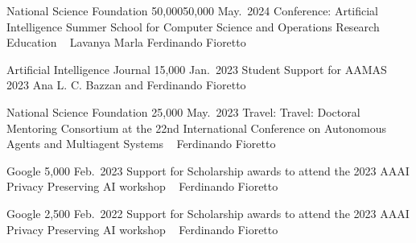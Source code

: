 \vspace{-16pt}

\begin{projects}
	\grantentrycoPI
	{National Science Foundation}
	{50,000}{50,000}
	{May.~2024}{}
	{Conference: Artificial Intelligence Summer School for Computer Science and Operations Research Education}
	{~}
	{Lavanya Marla}
	{Ferdinando Fioretto}

	\grantentrySinglePI
	{Artificial Intelligence Journal}
	{15,000}
	{Jan.~2023}{}
	{Student Support for AAMAS 2023}
	{}
	{Ana L. C. Bazzan and Ferdinando Fioretto}

	\grantentrySinglePI
	{National Science Foundation}
	{25,000}
	{May.~2023}{}
	{Travel: Travel: Doctoral Mentoring Consortium at the 22nd International Conference on Autonomous Agents and Multiagent Systems}
	{~}
	{Ferdinando Fioretto}

	\grantentrySinglePI
	{Google}
	{5,000}
	{Feb.~2023}{}
	{Support for Scholarship awards to attend the 2023 AAAI Privacy Preserving AI workshop}
	{~}
	{Ferdinando Fioretto}

	\grantentrySinglePI
	{Google}
	{2,500}
	{Feb.~2022}{}
	{Support for Scholarship awards to attend the 2023 AAAI Privacy Preserving AI workshop}
	{~}
	{Ferdinando Fioretto}
\end{projects}

\iffalse
\subsectionTitle{Under review/in preparation}
\begin{projects}
	\grantentrySinglePI
	{Amazon Research Awards AWS AI}
	{70,000}
	{}{}
	{The Principle of Data Minimization in Machine Learning}
	{~}
	{Ferdinando Fioretto}

	\grantentrySinglePI
	{National Science Foundation (CISE - SaTC)}
	{1,200,000}
	{}{}
	{Collaborative Research: SaTC: Medium: Post-processing in Differential Privacy: 
	Understanding Bias, Variance, and Fairness of Downstream Decisions}
	{~}
	{Ferdinando Fioretto and Juba Ziani}

	\grantentrySinglePI
	{National Science Foundation (ENG - CIS)}
	{500,000}
	{}{}
	{End-to-End Learning for Planning Safe, Comfortable, and Equitable Bicycle Infrastructure}
	{~}
	{Xilei Zhao and Ferdinando Fioretto}

	\grantentrySinglePI
	{DARPA YFA}
	{1,000,000}
	{}{}
	{Towards Certifiable Constraint-aware Generative Models}
	{~}
	{Ferdinando Fioretto}

	\grantentrySinglePI
	{National Science Foundation (CISE - RI)}
	{600,000}
	{}{}
	{RI: Small: Constraint-aware Generative AI: Adhering to Constraints and Physical Principles}
	{~}
	{Ferdinando Fioretto}
	
	\grantentrySinglePI
	{UVA RIA (intramural)}
	{60,000}
	{}{}
	{Understanding and Mitigating Privacy Leakage Risks for Large Language Model Applications}
	{~}
	{Ferdinando Fioretto and David Evans}

	\grantentrySinglePI
	{DOE Early Career Research Program}
	{not yet determined}
	{}{}
	{(pre-proposal stage) Deep Learning for Optimization in Multi-scale Systems}
	{~}
	{Ferdinando Fioretto}
	
\end{projects}
\fi
